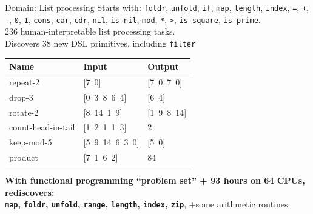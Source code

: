 \documentclass[aspectratio=169,final]{beamer}
\newcommand{\code}[1]{{\texttt{#1}}}
\begin{document}
\begin{frame}{Domain: List processing}
      Starts with: \code{foldr}, \code{unfold}, \code{if}, \code{map}, \code{length},
\code{index}, \code{=}, \code{+}, \code{-}, \code{0}, \code{1}, \code{cons},
\code{car}, \code{cdr}, \code{nil}, \code{is-nil},  \code{mod}, \code{*}, \code{>}, \code{is-square}, \code{is-prime}.
\\236 human-interpretable list processing tasks.
\\Discovers 38 new DSL primitives, including \code{filter}

\vspace{0.25cm}

\centering \begin{minipage}[c]{0.6\textwidth}
  \begin{tabular}{lll}
    \toprule
    Name & Input & Output \\\midrule
    repeat-2 & [7\, 0] & [7\, 0\, 7\, 0] \\
    drop-3 & [0\, 3\, 8\, 6\, 4] & [6\, 4] \\
    rotate-2 & [8\, 14\, 1\, 9] & [1\, 9\, 8\, 14] \\
    count-head-in-tail & [1\, 2\, 1\, 1\, 3] & 2 \\
    keep-mod-5 & [5\, 9\, 14\, 6\, 3\, 0] & [5\, 0] \\
    product & [7\, 1\, 6\, 2] & 84 \\
    \bottomrule
  \end{tabular}
\end{minipage}%

\vspace{0.25cm}

\centering \textbf{With functional programming ``problem set'' + 93 hours on 64 CPUs, rediscovers:}\\
\textbf{\code{map}, \code{foldr}, \code{unfold}, \code{range}, \code{length}, \code{index}, \code{zip}}, +some arithmetic routines


  \end{frame}
\end{document}
